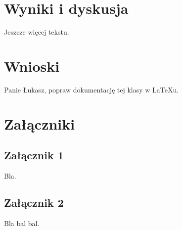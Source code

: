 \documentclass{SGGW-thesis}
\begin{document}
\chapter{Wyniki i dyskusja}
Jeszcze więcej tekstu.

\chapter{Wnioski}
Panie Łukasz, popraw dokumentację tej klasy w LaTeXu.

\chapter{Załączniki}
\section{Załącznik 1}
Bla.

\section{Załącznik 2}
Bla bal bal.



\beforelastpage[2023]
\end{document}
